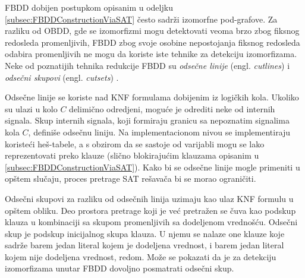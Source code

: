 FBDD dobijen postupkom opisanim u odeljku \ref{subsec:FBDDConstructionViaSAT} \v{c}esto sadr\v{z}i izomorfne pod-grafove. Za razliku od OBDD, gde se izomorfizmi mogu detektovati veoma brzo zbog fiksnog redosleda promenljivih, FBDD zbog svoje osobine nepostojanja fiksnog redosleda odabira promenljivih ne mogu da koriste iste tehnike za detekciju izomorfizama. Neke od poznatijih tehnika redukcije FBDD su \emph{odse\v{c}ne linije} (engl. \emph{cutlines}) i \emph{odse\v{c}ni skupovi} (engl. \emph{cutsets}) \cite{FBDD}.

Odse\v{c}ne linije se koriste nad KNF formulama dobijenim iz logi\v{c}kih kola. Ukoliko su ulazi u kolo $C$ delimi\v{c}no odredjeni, mogu\'c{}e je odrediti neke od internih signala. Skup internih signala, koji formiraju granicu sa nepoznatim signalima kola $C$, defini\v{s}e odse\v{c}nu liniju. Na implementacionom nivou se implementiraju koriste\'c{}i he\v{s}-tabele, a s obzirom da se sastoje od varijabli mogu se lako reprezentovati preko klauze (sli\v{c}no blokiraju\'c{}im klauzama opisanim u \ref{subsec:FBDDConstructionViaSAT}). Kako bi se odse\v{c}ne linije mogle primeniti u op\v{s}tem slu\v{c}aju, proces pretrage SAT re\v{s}ava\v{c}a bi se morao ograni\v{c}iti.

Odse\v{c}ni skupovi za razliku od odse\v{c}nih linija uzimaju kao ulaz KNF formulu u op\v{s}tem obliku. Deo prostora pretrage koji je ve\'c{} pretra\v{z}en se \v{c}uva kao podskup klauza u kombinaciji sa skupom promenljivih sa dodeljenom vredno\v{s}\'c{}u. Odse\v{c}ni skup je podskup inicijalnog skupa klauza. U njemu se nalaze one klauze koje sadr\v{z}e barem jedan literal kojem je dodeljena vrednost, i barem jedan literal kojem nije dodeljena vrednost, redom. Mo\v{z}e se pokazati da je za detekciju izomorfizama unutar FBDD dovoljno posmatrati odse\v{c}ni skup.
